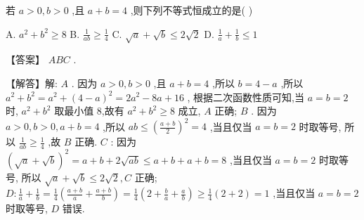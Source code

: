\documentclass[11pt,a4paper]{article}
\begin{document}
\begin{problem} 
若 \(\displaystyle a > 0,b > 0\) ,且 \(\displaystyle a + b = 4\) ,则下列不等式恒成立的是(   )

A. \(\displaystyle {a}^{2} + {b}^{2} \geq  8\) B. \(\displaystyle \frac{1}{ab} \geq  \frac{1}{4}\) C. \(\displaystyle \sqrt{a} + \sqrt{b} \leq  2\sqrt{2}\) D. \(\displaystyle \frac{1}{a} + \frac{1}{b} \leq  1\)
\begin{jiexi}[25]
【答案】 \(\displaystyle {ABC}\) .

【解答】解: \(\displaystyle A\) . 因为 \(\displaystyle a > 0,b > 0\) ,且 \(\displaystyle a + b = 4\) ,所以 \(\displaystyle b = 4 - a\) ,所以 \(\displaystyle {a}^{2} + {b}^{2} = {a}^{2} + {\left( 4 - a\right) }^{2} = 2{a}^{2} - {8a} + {16}\) , 根据二次函数性质可知,当 \(\displaystyle a = b = 2\) 时, \(\displaystyle {a}^{2} + {b}^{2}\) 取最小值 8,故有 \(\displaystyle {a}^{2} + {b}^{2} \geq  8\) 成立, \(\displaystyle A\) 正确; \(\displaystyle B\) . 因为 \(\displaystyle a > 0,b > 0,a + b = 4\) ,所以 \(\displaystyle {ab} \leq  {\left( \frac{a + b}{2}\right) }^{2} = 4\) ,当且仅当 \(\displaystyle a = b = 2\) 时取等号, 所以 \(\displaystyle \frac{1}{ab} \geq  \frac{1}{4}\) ,故 \(\displaystyle B\) 正确. \(\displaystyle C\) : 因为 \(\displaystyle {\left( \sqrt{a} + \sqrt{b}\right) }^{2} = a + b + 2\sqrt{ab} \leq  a + b + a + b = 8\) ,当且仅当 \(\displaystyle a = b = 2\) 时取等号, 所以 \(\displaystyle \sqrt{a} + \sqrt{b} \leq  2\sqrt{2},C\) 正确; \(\displaystyle D : \frac{1}{a} + \frac{1}{b} = \frac{1}{4}\left( {\frac{a + b}{a} + \frac{a + b}{b}}\right)  = \frac{1}{4}\left( {2 + \frac{b}{a} + \frac{a}{b}}\right)  \geq  \frac{1}{4}\left( {2 + 2}\right)  = 1\) ,当且仅当 \(\displaystyle a = b = 2\) 时取等号, \(\displaystyle D\) 错误.
\end{jiexi}
\end{problem}
\end{document}
